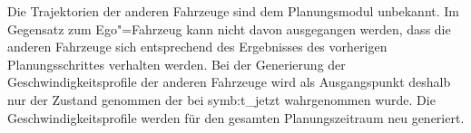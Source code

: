 Die Trajektorien der anderen Fahrzeuge sind dem Planungsmodul unbekannt.
Im Gegensatz zum Ego"=Fahrzeug kann nicht davon ausgegangen werden, dass die anderen Fahrzeuge sich entsprechend des Ergebnisses des vorherigen Planungsschrittes verhalten werden.
Bei der Generierung der Geschwindigkeitsprofile der anderen Fahrzeuge wird als Ausgangspunkt deshalb nur der Zustand genommen der bei \gls{symb:t_jetzt} wahrgenommen wurde.
Die Geschwindigkeitsprofile werden f\"ur den gesamten Planungszeitraum neu generiert.
